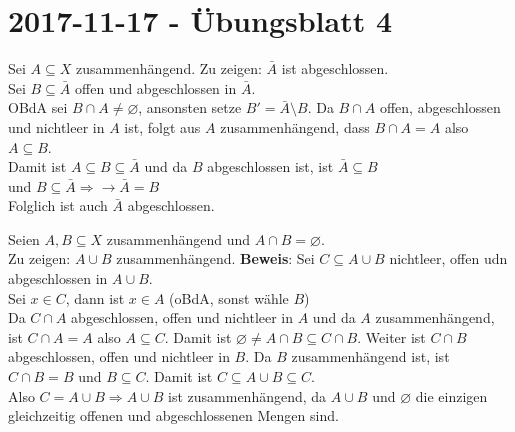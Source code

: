 \section{2017-11-17 - Übungsblatt 4}
% 
\begin{problem*}[1]
Sei $A \subseteq X$ zusammenhängend. Zu zeigen: $\bar{A}$ ist abgeschlossen.\\ 
Sei $B \subseteq \bar{A}$ offen und abgeschlossen in $\bar{A}$.\\
OBdA sei $B \cap A \neq \varnothing$, ansonsten setze $B' = \bar{A}\setminus B$.
Da $B \cap A$ offen, abgeschlossen und nichtleer in $A$ ist, folgt aus $A$ zusammenhängend, dass 
$B \cap A = A$ also $A \subseteq B$.\\
Damit ist $A \subseteq B \subseteq \bar{A} $ und da $ B $ abgeschlossen ist, ist $ \bar{A} \subseteq B $\\
und $B \subseteq \bar{A} \Rightarrow \rightarrow \bar{A} = B$\\
Folglich ist auch $ \bar{A} $ abgeschlossen.
\end{problem*}

\begin{problem*}[1b]
Seien $ A,B \subseteq X$ zusammenhängend und $ A \cap B = \varnothing $.\\
Zu zeigen: $ A \cup B$ zusammenhängend.
\textbf{Beweis}: Sei $C \subseteq A \cup B$ nichtleer, offen udn abgeschlossen in $ A \cup B$.\\
Sei $x \in C$, dann ist $ x \in A$ (oBdA, sonst wähle $ B $)\\
Da $C \cap A$ abgeschlossen, offen und nichtleer in $ A $ und da $ A $ zusammenhängend, ist $ C \cap A = A$
also $A \subseteq C$. Damit ist $\varnothing \neq A \cap B \subseteq C \cap B$. Weiter ist $C \cap B$ abgeschlossen, offen und nichtleer in $ B $. Da $ B $ zusammenhängend ist, ist $ C \cap B = B$ und $B \subseteq C$. Damit ist $C \subseteq A \cup B \subseteq C$.\\
Also $C = A \cup B \Rightarrow A \cup B$ ist zusammenhängend, da $ A \cup B $ und $\varnothing$ die einzigen gleichzeitig offenen und abgeschlossenen Mengen sind.  

\end{problem*}

